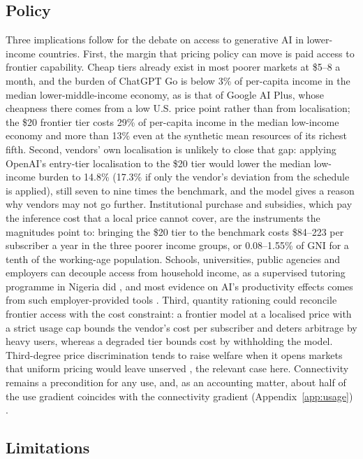\documentclass[11pt]{article}
\theoremstyle{definition}
\theoremstyle{remark}
\begin{document}
\subsection{Policy}

Three implications follow for the debate on access to generative AI in lower-income countries. First, the margin that pricing policy can move is paid access to frontier capability. Cheap tiers already exist in most poorer markets at \$5--8 a month, and the burden of ChatGPT Go is below 3\% of per-capita income in the median lower-middle-income economy, as is that of Google AI Plus, whose cheapness there comes from a low U.S. price point rather than from localisation; the \$20 frontier tier costs 29\% of per-capita income in the median low-income economy and more than 13\% even at the synthetic mean resources of its richest fifth. Second, vendors' own localisation is unlikely to close that gap: applying OpenAI's entry-tier localisation to the \$20 tier would lower the median low-income burden to 14.8\% (17.3\% if only the vendor's deviation from the schedule is applied), still seven to nine times the benchmark, and the model gives a reason why vendors may not go further. Institutional purchase and subsidies, which pay the inference cost that a local price cannot cover, are the instruments the magnitudes point to: bringing the \$20 tier to the benchmark costs \$84--223 per subscriber a year in the three poorer income groups, or 0.08--1.55\% of GNI for a tenth of the working-age population. Schools, universities, public agencies and employers can decouple access from household income, as a supervised tutoring programme in Nigeria did \citep{desimone2025chalkboards}, and most evidence on AI's productivity effects comes from such employer-provided tools \citep{brynjolfsson2025generative,cui2024effects}. Third, quantity rationing could reconcile frontier access with the cost constraint: a frontier model at a localised price with a strict usage cap bounds the vendor's cost per subscriber and deters arbitrage by heavy users, whereas a degraded tier bounds cost by withholding the model. Third-degree price discrimination tends to raise welfare when it opens markets that uniform pricing would leave unserved \citep{varian1985price,aguirre2010monopoly}, the relevant case here. Connectivity remains a precondition for any use, and, as an accounting matter, about half of the use gradient coincides with the connectivity gradient (Appendix~\ref{app:usage}) \citep{worldbank2026wdr,itu2025ff,hjort2019arrival}.

\subsection{Limitations}\label{sec:limitations}
\end{document}
